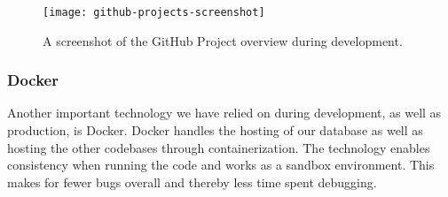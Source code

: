 \begin{figure}[h]
    \centering
    \texttt{[image: github-projects-screenshot]}
    \caption{A screenshot of the GitHub Project overview during development.
    }\label{fig:github-projects-screenshot}
\end{figure}

\subsubsection{Docker}

Another important technology we have relied on during development, as well as production, is Docker.
Docker handles the hosting of our database as well as hosting the other codebases through containerization.
The technology enables consistency when running the code and works as a sandbox environment.
This makes for fewer bugs overall and thereby less time spent debugging.
